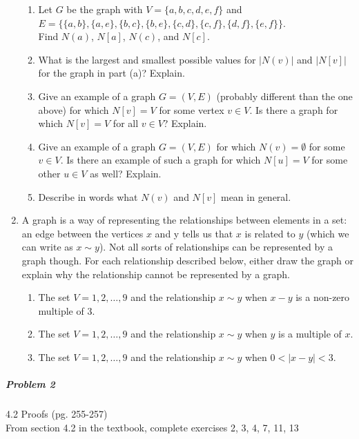 \documentclass[11pt,a4paper]{article}
\begin{document}
\begin{enumerate}
\begin{enumerate}
        \item Let $G$ be the graph with $V = \{a,b,c,d,e,f\}$ and\\ $E = \{\{a,b\},\{a,e\},\{b,c\},\{b,e\},\{c,d\},\{c,f\},\{d,f\},\{e,f\}\}$. \\Find $N(a)$, $N[a]$, $N(c)$, and $N[c]$.
        \item What is the largest and smallest possible values for $|N(v)|$ and $|N[v]|$ for the graph in part (a)? Explain.
        \item Give an example of a graph $G=(V,E)$ (probably different than the one above) for which $N[v]=V$ for some vertex $v\in V$. Is there a graph for which $N[v]=V$ for all $v\in V$? Explain.
        \item Give an example of a graph $G=(V,E)$ for which $N(v)=\emptyset$ for some $v\in V$. Is there an example of such a graph for which $N[u]=V$ for some other $u\in V$ as well? Explain.
        \item Describe in words what $N(v)$ and $N[v]$ mean in general.

        \end{enumerate}

        \item A graph is a way of representing the relationships between elements in a set: an edge between the vertices $x$ and y tells us that $x$ is related to $y$ (which we can write as $x\sim y$). Not all sorts of relationships can be represented by a graph though. For each relationship described below, either draw the graph or explain why the relationship cannot be represented by a graph.

            \begin{enumerate}
                \item The set $V={1,2,…,9}$ and the relationship $x\sim y$ when $x-y$ is a non-zero multiple of 3.
                \item The set $V={1,2,…,9}$ and the relationship $x\sim y$ when $y$ is a multiple of $x$.
                \item The set $V={1,2,…,9}$ and the relationship $x\sim y$ when $0<|x−y|<3$.

            \end{enumerate}
        \end{enumerate}
	
	\subparagraph{Problem 2} 4.2 Proofs (pg. 255-257) \\
	
		From section 4.2 in the textbook, complete exercises 2, 3, 4, 7, 11, 13
\end{document}
